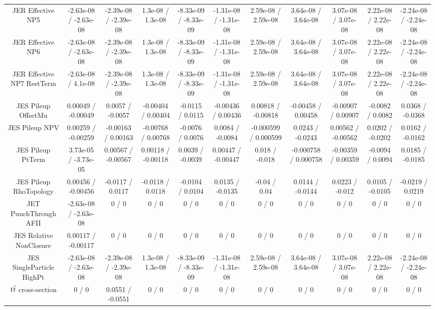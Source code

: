 \begin{table}[htbp]
\begin{center}
\begin{tabular}{|c|c|c|c|c|c|c|c|c|c|c|}
  JER Effective NP5 & -2.63e-08 / -2.63e-08 & -2.39e-08 / -2.39e-08 & 1.3e-08 / 1.3e-08 & -8.33e-09 / -8.33e-09 & -1.31e-08 / -1.31e-08 & 2.59e-08 / 2.59e-08 & 3.64e-08 / 3.64e-08 & 3.07e-08 / 3.07e-08 & 2.22e-08 / 2.22e-08 & -2.24e-08 / -2.24e-08 \\ 
  JER Effective NP6 & -2.63e-08 / -2.63e-08 & -2.39e-08 / -2.39e-08 & 1.3e-08 / 1.3e-08 & -8.33e-09 / -8.33e-09 & -1.31e-08 / -1.31e-08 & 2.59e-08 / 2.59e-08 & 3.64e-08 / 3.64e-08 & 3.07e-08 / 3.07e-08 & 2.22e-08 / 2.22e-08 & -2.24e-08 / -2.24e-08 \\ 
  JER Effective NP7 RestTerm & -2.63e-08 / 4.1e-08 & -2.39e-08 / -2.39e-08 & 1.3e-08 / 1.3e-08 & -8.33e-09 / -8.33e-09 & -1.31e-08 / -1.31e-08 & 2.59e-08 / 2.59e-08 & 3.64e-08 / 3.64e-08 & 3.07e-08 / 3.07e-08 & 2.22e-08 / 2.22e-08 & -2.24e-08 / -2.24e-08 \\ 
  JES Pileup OffsetMu & 0.00049 / -0.00049 & 0.0057 / -0.0057 & -0.00404 / 0.00404 & -0.0115 / 0.0115 & -0.00436 / 0.00436 & 0.00818 / -0.00818 & -0.00458 / 0.00458 & -0.00907 / 0.00907 & -0.0082 / 0.0082 & 0.0368 / -0.0368 \\ 
  JES Pileup NPV & 0.00259 / -0.00259 & -0.00163 / 0.00163 & -0.00768 / 0.00768 & -0.0076 / 0.0076 & 0.0084 / -0.0084 & -0.000599 / 0.000599 & 0.0243 / -0.0243 & 0.00562 / -0.00562 & 0.0202 / -0.0202 & 0.0162 / -0.0162 \\ 
  JES Pileup PtTerm & 3.73e-05 / -3.73e-05 & 0.00567 / -0.00567 & 0.00118 / -0.00118 & 0.0039 / -0.0039 & 0.00447 / -0.00447 & 0.018 / -0.018 & -0.000758 / 0.000758 & -0.00359 / 0.00359 & -0.0094 / 0.0094 & 0.0185 / -0.0185 \\ 
  JES Pileup RhoTopology & 0.00456 / -0.00456 & -0.0117 / 0.0117 & -0.0118 / 0.0118 & -0.0104 / 0.0104 & 0.0135 / -0.0135 & -0.04 / 0.04 & 0.0144 / -0.0144 & 0.0223 / -0.012 & 0.0105 / -0.0105 & -0.0219 / 0.0219 \\ 
  JET PunchThrough AFII & -2.63e-08 / -2.63e-08 & 0 / 0 & 0 / 0 & 0 / 0 & 0 / 0 & 0 / 0 & 0 / 0 & 0 / 0 & 0 / 0 & 0 / 0 \\ 
  JES Relative NonClosure & 0.00117 / -0.00117 & 0 / 0 & 0 / 0 & 0 / 0 & 0 / 0 & 0 / 0 & 0 / 0 & 0 / 0 & 0 / 0 & 0 / 0 \\ 
  JES SingleParticle HighPt & -2.63e-08 / -2.63e-08 & -2.39e-08 / -2.39e-08 & 1.3e-08 / 1.3e-08 & -8.33e-09 / -8.33e-09 & -1.31e-08 / -1.31e-08 & 2.59e-08 / 2.59e-08 & 3.64e-08 / 3.64e-08 & 3.07e-08 / 3.07e-08 & 2.22e-08 / 2.22e-08 & -2.24e-08 / -2.24e-08 \\ 
$  \it{t\bar{t}}$ cross-section & 0 / 0 & 0.0551 / -0.0551 & 0 / 0 & 0 / 0 & 0 / 0 & 0 / 0 & 0 / 0 & 0 / 0 & 0 / 0 & 0 / 0 \\ 

\end{tabular}
\end{center}
\end{table}
